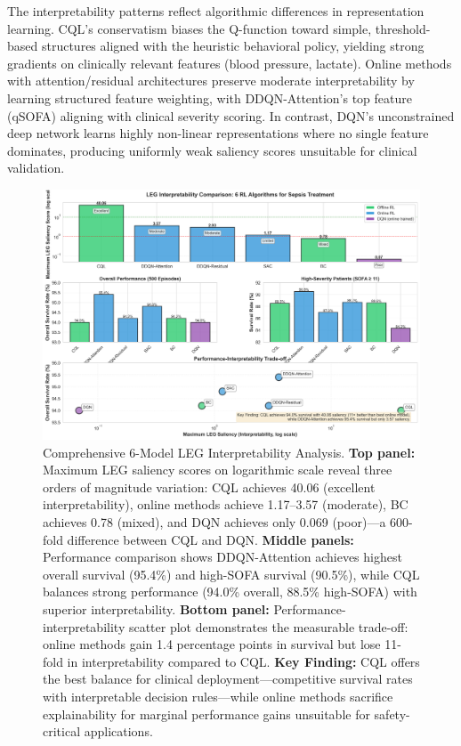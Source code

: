 The interpretability patterns reflect algorithmic differences in representation learning. CQL's conservatism biases the Q-function toward simple, threshold-based structures aligned with the heuristic behavioral policy, yielding strong gradients on clinically relevant features (blood pressure, lactate). Online methods with attention/residual architectures preserve moderate interpretability by learning structured feature weighting, with DDQN-Attention's top feature (qSOFA) aligning with clinical severity scoring. In contrast, DQN's unconstrained deep network learns highly non-linear representations where no single feature dominates, producing uniformly weak saliency scores unsuitable for clinical validation.

\begin{figure}[htbp]
\centering
\includegraphics[width=\textwidth]{../results/figures/leg_6model_comparison.png}
\caption{Comprehensive 6-Model LEG Interpretability Analysis. \textbf{Top panel:} Maximum LEG saliency scores on logarithmic scale reveal three orders of magnitude variation: CQL achieves 40.06 (excellent interpretability), online methods achieve 1.17--3.57 (moderate), BC achieves 0.78 (mixed), and DQN achieves only 0.069 (poor)—a 600-fold difference between CQL and DQN. \textbf{Middle panels:} Performance comparison shows DDQN-Attention achieves highest overall survival (95.4\%) and high-SOFA survival (90.5\%), while CQL balances strong performance (94.0\% overall, 88.5\% high-SOFA) with superior interpretability. \textbf{Bottom panel:} Performance-interpretability scatter plot demonstrates the measurable trade-off: online methods gain 1.4 percentage points in survival but lose 11-fold in interpretability compared to CQL. \textbf{Key Finding:} CQL offers the best balance for clinical deployment---competitive survival rates with interpretable decision rules---while online methods sacrifice explainability for marginal performance gains unsuitable for safety-critical applications.}
\label{fig:leg-6model}
\end{figure}

